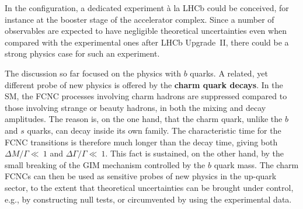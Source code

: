 In the \FCChh configuration, a dedicated experiment  \`{a} la LHCb could be conceived, for instance at the booster stage of the accelerator complex. Since a number of observables are expected to have negligible theoretical uncertainties even when compared with the experimental ones  after LHCb Upgrade~II, there could be a strong physics case for such an experiment.



The discussion so far focused on the physics with $b$ quarks. A related, yet different probe of new physics is offered by the {\bf charm quark decays}. In the SM, the FCNC processes involving charm hadrons are suppressed compared to those involving strange or beauty hadrons, in both the mixing and decay amplitudes. The reason is, on the one hand, that the charm quark, unlike the $b$ and $s$ quarks, can decay inside its own family. The characteristic time for the FCNC transitions is therefore much longer than the decay time, giving both $\Delta M/\Gamma\ll~1$ and $\Delta \Gamma/\Gamma\ll~1$. This fact is sustained, on the other hand, by the small breaking of the GIM mechanism controlled by the $b$ quark mass. 
The charm FCNCs can then be used as sensitive probes of new physics in the up-quark
sector, to the extent that theoretical uncertainties can be brought
under control, e.g., by constructing null tests, or circumvented by using the experimental data.


